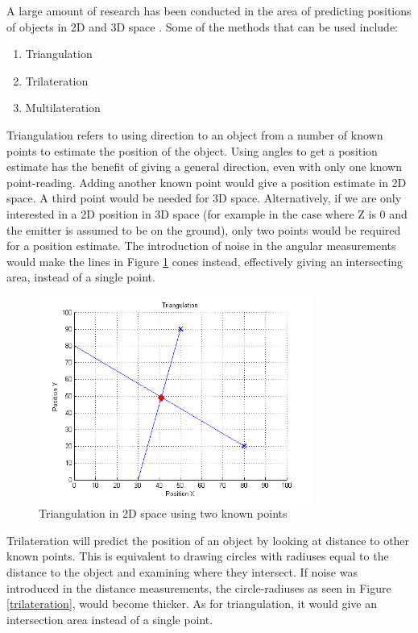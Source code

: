 \documentclass[10pt,a4paper]{book}
\begin{document}

A large amount of research has been conducted in the area of predicting positions of objects in 2D and 3D space \cite{srinivasan2007survey}. Some of the methods that can be used include:

\begin{enumerate}
\item Triangulation
\item Trilateration
\item Multilateration
\end{enumerate}

Triangulation refers to using direction to an object from a number of known points to estimate the position of the object. Using angles to get a position estimate has the benefit of giving a general direction, even with only one known point-reading. Adding another known point would give a position estimate in 2D space. A third point would be needed for 3D space. Alternatively, if we are only interested in a 2D position in 3D space (for example in the case where Z is 0 and the emitter is assumed to be on the ground), only two points would be required for a position estimate. The introduction of noise in the angular measurements would make the lines in Figure \ref{triangulation} cones instead, effectively giving an intersecting area, instead of a single point.

\begin{figure}[H]
\centering
\includegraphics[width=90mm]{triangulation.png}
\caption{Triangulation in 2D space using two known points}
\label{triangulation}
\end{figure}

Trilateration will predict the position of an object by looking at distance to other known points. This is equivalent to drawing circles with radiuses equal to the distance to the object and examining where they intersect. If noise was introduced in the distance measurements, the circle-radiuses as seen in Figure \ref{trilateration}, would become thicker. As for triangulation, it would give an intersection area instead of a single point.
\end{document}
